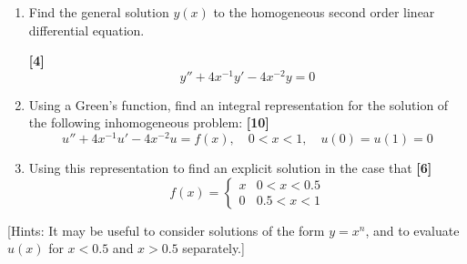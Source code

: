 \documentclass[a4paper]{article}
\begin{document}
\begin{qns}\leavevmode
\begin{enumerate}[label=(\alph*)]
\item Find the general solution $y(x)$ to the homogeneous second order linear differential equation.

\hfill \textbf{[4]}
$$y''+4x^{-1}y'-4x^{-2}y=0$$
\item Using a Green's function, find an integral representation for the solution of the following inhomogeneous problem: \hfill \textbf{[10]}
$$u''+4x^{-1}u'-4x^{-2}u=f(x),\quad 0<x<1,\quad u(0)=u(1)=0$$
\item Using this representation to find an explicit solution in the case that \hfill \textbf{[6]}
$$f(x)=
\left\{
        \begin{array}{ll}
      x & 0<x<0.5 \\
      0 & 0.5<x<1
        \end{array}
    \right.$$
\end{enumerate}
[Hints: It may be useful to consider solutions of the form $y=x^n$, and to evaluate $u(x)$ for $x<0.5$ and $x>0.5$ separately.]
\end{qns}
\end{document}
